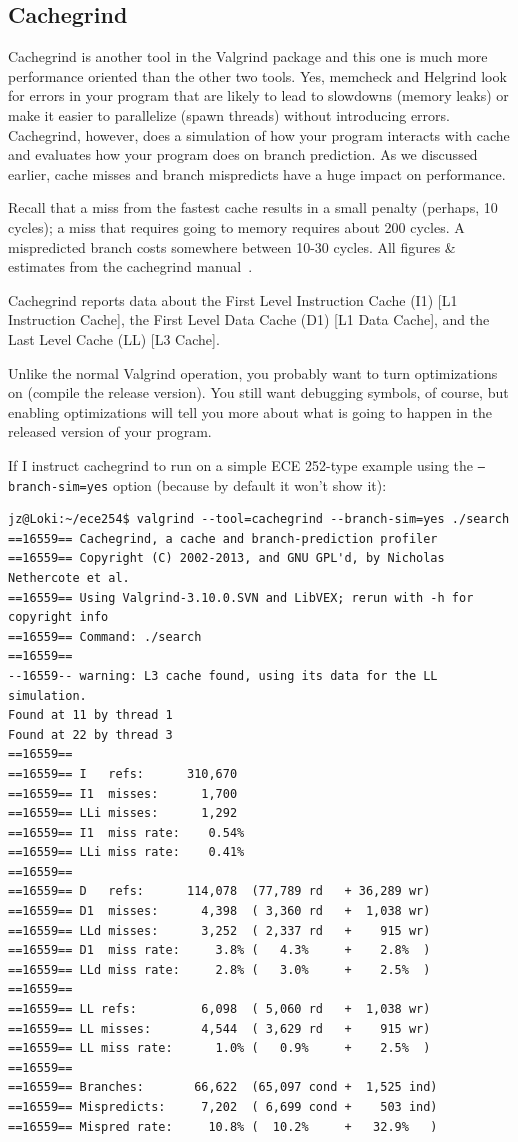 \subsection*{Cachegrind}

Cachegrind is another tool in the Valgrind package and this one is much more performance oriented than the other two tools. Yes, memcheck and Helgrind look for errors in your program that are likely to lead to slowdowns (memory leaks) or make it easier to parallelize (spawn threads) without introducing errors. Cachegrind, however, does a simulation of how your program interacts with cache and evaluates how your program does on branch prediction. As we discussed earlier, cache misses and branch mispredicts have a huge impact on performance.

Recall that a miss from the fastest cache results in a small penalty (perhaps, 10 cycles); a miss that requires going to memory requires about 200 cycles. A mispredicted branch costs somewhere between 10-30 cycles. All figures \& estimates from the cachegrind manual~\cite{cachegrind}.

Cachegrind reports data about the First Level Instruction Cache (I1) [L1 Instruction Cache], the First Level Data Cache (D1) [L1 Data Cache], and the Last Level Cache (LL) [L3 Cache].

Unlike the normal Valgrind operation, you probably want to turn optimizations on (compile the release version). You still want debugging symbols, of course, but enabling optimizations will tell you more about what is going to happen in the released version of your program.

If I instruct cachegrind to run on a simple ECE 252-type example using the \texttt{--branch-sim=yes} option (because by default it won't show it):

\begin{lstlisting}
jz@Loki:~/ece254$ valgrind --tool=cachegrind --branch-sim=yes ./search
==16559== Cachegrind, a cache and branch-prediction profiler
==16559== Copyright (C) 2002-2013, and GNU GPL'd, by Nicholas Nethercote et al.
==16559== Using Valgrind-3.10.0.SVN and LibVEX; rerun with -h for copyright info
==16559== Command: ./search
==16559== 
--16559-- warning: L3 cache found, using its data for the LL simulation.
Found at 11 by thread 1 
Found at 22 by thread 3 
==16559== 
==16559== I   refs:      310,670
==16559== I1  misses:      1,700
==16559== LLi misses:      1,292
==16559== I1  miss rate:    0.54%
==16559== LLi miss rate:    0.41%
==16559== 
==16559== D   refs:      114,078  (77,789 rd   + 36,289 wr)
==16559== D1  misses:      4,398  ( 3,360 rd   +  1,038 wr)
==16559== LLd misses:      3,252  ( 2,337 rd   +    915 wr)
==16559== D1  miss rate:     3.8% (   4.3%     +    2.8%  )
==16559== LLd miss rate:     2.8% (   3.0%     +    2.5%  )
==16559== 
==16559== LL refs:         6,098  ( 5,060 rd   +  1,038 wr)
==16559== LL misses:       4,544  ( 3,629 rd   +    915 wr)
==16559== LL miss rate:      1.0% (   0.9%     +    2.5%  )
==16559== 
==16559== Branches:       66,622  (65,097 cond +  1,525 ind)
==16559== Mispredicts:     7,202  ( 6,699 cond +    503 ind)
==16559== Mispred rate:     10.8% (  10.2%     +   32.9%   )
\end{lstlisting}

